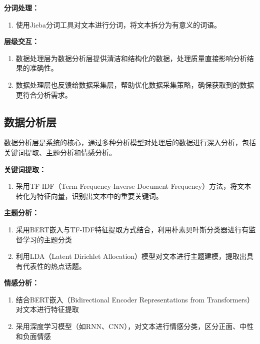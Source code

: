 \documentclass[UTF8,a4paper,15pt,titlepage,oneside]{ctexbook}
\begin{document}
\vskip 0.2cm
\noindent
\textbf{分词处理：}

\begin{enumerate}[\textbullet]
  \item 使用Jieba分词工具对文本进行分词，将文本拆分为有意义的词语。
\end{enumerate}

\vskip 0.2cm
\noindent
\textbf{层级交互：}

\begin{enumerate}[\textbullet]
  \item 数据处理层为数据分析层提供清洁和结构化的数据，处理质量直接影响分析结果的准确性。
  \item 数据处理层也反馈给数据采集层，帮助优化数据采集策略，确保获取到的数据更符合分析需求。

\end{enumerate}

\subsection{数据分析层}

数据分析层是系统的核心，通过多种分析模型对处理后的数据进行深入分析，包括关键词提取、主题分析和情感分析。

\vskip 0.2cm
\noindent
\textbf{关键词提取：}

\begin{enumerate}[\textbullet]
  \item 采用TF-IDF（Term Frequency-Inverse Document Frequency）方法，将文本转化为特征向量，识别出文本中的重要关键词。
\end{enumerate}

\vskip 0.2cm
\noindent
\textbf{主题分析：}

\begin{enumerate}[\textbullet]
  \item 采用BERT嵌入与TF-IDF特征提取方式结合，利用朴素贝叶斯分类器进行有监督学习的主题分类
  \item 利用LDA（Latent Dirichlet Allocation）模型对文本进行主题建模，提取出具有代表性的热点话题。
\end{enumerate}

\vskip 0.2cm
\noindent
\textbf{情感分析：}

\begin{enumerate}[\textbullet]
  \item 结合BERT嵌入（Bidirectional Encoder Representations from Transformers）对文本进行特征提取
  \item 采用深度学习模型（如RNN、CNN），对文本进行情感分类，区分正面、中性和负面情感
\end{enumerate}
\end{document}
